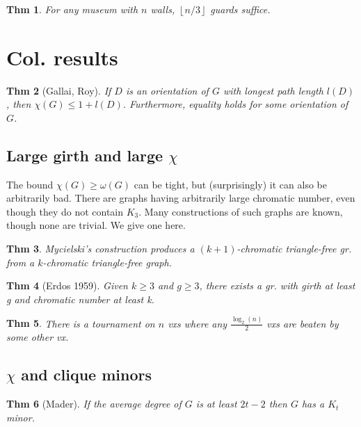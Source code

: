 \documentclass[11pt, fleqn, a4paper, landscape]{article}
\theoremstyle{plain} %
\newtheorem{thm}{Thm}
\theoremstyle{remark} %
\theoremstyle{definition} %
\newtheorem{defi}[thm]{Def}
\begin{document}
\begin{multicols}{5}
\begin{thm}
For any museum with $n$ walls, $\left\lfloor n/3\right\rfloor$ guards suffice.
\end{thm}

\section{Col. results}
\begin{thm}[Gallai, Roy]
If $D$ is an orientation of $G$ with longest path length $l(D)$, then $\chi(G) \le 1 + l(D)$. Furthermore, equality holds for some orientation of $G$.
\end{thm} 

\subsection{Large girth and large $\chi$}

The bound $\chi(G) \ge \omega(G)$ can be tight, but (surprisingly) it can also be arbitrarily bad. There are graphs having arbitrarily large chromatic number, even though they do not contain $K_3$. Many constructions of such graphs are known, though none are trivial. We give one here.
\addtocounter{thm}{1}
\begin{thm}
Mycielski’s construction produces a $(k + 1)$-chromatic triangle-free gr. from a $k$-chromatic triangle-free graph.
\end{thm}

\addtocounter{thm}{1}
\begin{thm}[Erdos 1959]
Given $k \ge 3$ and $g \ge 3$, there exists a gr. with girth at least g and
chromatic number at least k.
\end{thm} 
\addtocounter{thm}{2}
\begin{thm}
There is a tournament on $n$ vxs where any $\frac{\log_2(n)}{2}$ vxs are beaten by some other vx.
\end{thm}
\subsection{$\chi$ and clique minors}
%
\addtocounter{thm}{3}
\begin{thm}[Mader]
If the average degree of $G$ is at least $2t-2$ then $G$ has a $K_t$ minor.
\end{thm}


\end{multicols}
\end{document}
